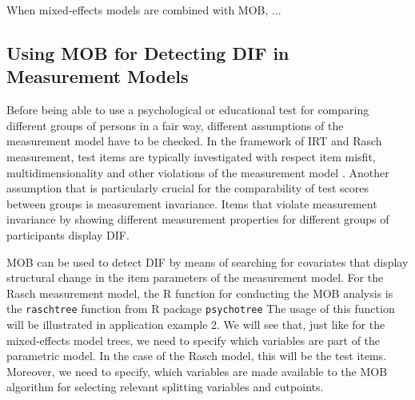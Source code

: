 \documentclass[doc,floatsintext,natbib]{apa7}
\begin{document}
When mixed-effects models are combined with MOB, ...


\subsection{Using MOB for Detecting DIF in Measurement Models}

Before being able to use a psychological or educational test for comparing different groups of persons in a fair way, different assumptions of the measurement model have to be checked. In the framework of IRT and Rasch measurement, test items are typically investigated with respect item misfit, multidimensionality and other violations of the measurement model \citep[cf., e.g.,][for an introduction]{DebStrZei:2022:CRC}. Another assumption that is particularly crucial for the comparability of test scores between groups is measurement invariance. Items that violate measurement invariance by showing different measurement properties for different groups of participants display DIF.

MOB can be used to detect DIF by means of searching for covariates that display structural change in the item parameters of the measurement model. For the Rasch measurement model, the R function for conducting the MOB analysis is the \texttt{raschtree} function from R package \texttt{psychotree} \citep{StroyKopf15}  The usage of this function will be illustrated in application example 2. We will see that, just like for the mixed-effects model trees, we need to specify which variables are part of the parametric model. In the case of the Rasch model, this will be the test items. Moreover, we need to specify, which variables are made available to the MOB algorithm for selecting relevant splitting variables and cutpoints. 
\end{document}
